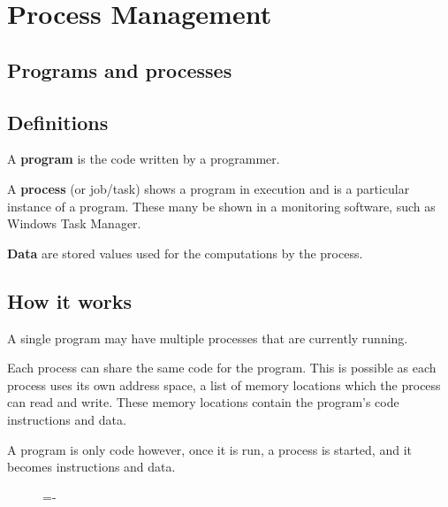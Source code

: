 \documentclass[a4paper]{systems-software}
\begin{document}
\chapter{Process Management}

\section{Programs and processes}

\section*{Definitions}

A \textbf{program} is the code written by a programmer.

A \textbf{process} (or job/task) shows a program in execution and is a particular instance of a program. These many be shown in a monitoring software, such as Windows Task Manager.

\textbf{Data} are stored values used for the computations by the process.


\section*{How it works}

A single program may have multiple processes that are currently running.

Each process can share the same code for the program. This is possible as each process uses its own address space, a list of memory locations which the process can read and write. These memory locations contain the program’s code instructions and data.

A program is only code however, once it is run, a process is started, and it becomes instructions and data.

\begin{figure}[H]
  \lineskip=-\fboxrule
\end{figure}
\end{document}
